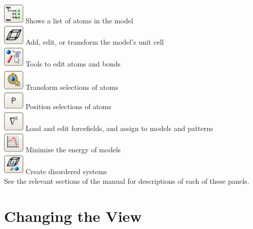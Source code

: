 \noindent
\includegraphics[width=1cm]{images/stack_atomlist} Shows a list of atoms in the model \\
\includegraphics[width=1cm]{images/stack_cell} Add, edit, or transform the model's unit cell \\
\includegraphics[width=1cm]{images/stack_edit} Tools to edit atoms and bonds \\
\includegraphics[width=1cm]{images/stack_transform} Transform selections of atoms \\
\includegraphics[width=1cm]{images/stack_position} Position selections of atoms \\
\includegraphics[width=1cm]{images/stack_ff} Load and edit forcefields, and assign to models and patterns \\
\includegraphics[width=1cm]{images/stack_minimise} Minimise the energy of models \\
\includegraphics[width=1cm]{images/stack_disorder} Create disordered systems \\

See the relevant sections of the manual for descriptions of each of these panels.

\section{Changing the View}

